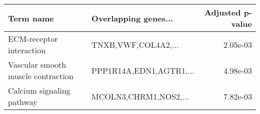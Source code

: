 \begin{tabular}{llr}
\toprule
                         Term name &    Overlapping genes... &  Adjusted p-value \\
\midrule
          ECM-receptor interaction &     TNXB,VWF,COL4A2,... &          2.05e-03 \\
Vascular smooth muscle contraction & PPP1R14A,EDN1,AGTR1,... &          4.98e-03 \\
         Calcium signaling pathway &   MCOLN3,CHRM1,NOS2,... &          7.82e-03 \\
\bottomrule
\end{tabular}
